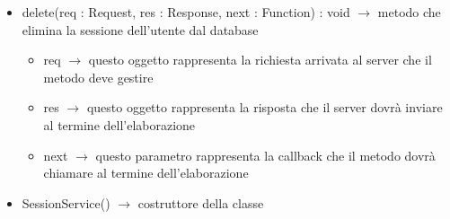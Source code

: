 \begin{description}
\begin{itemize}
	\item delete(req : Request, res : Response, next : Function) : void $\rightarrow$ metodo che elimina la sessione dell'utente dal database\begin{itemize}
		\item req $\rightarrow$ questo oggetto rappresenta la richiesta arrivata al server che il metodo deve gestire
		\item res $\rightarrow$ questo oggetto rappresenta la risposta che il server dovrà inviare al termine dell'elaborazione
		\item next $\rightarrow$ questo parametro rappresenta la callback che il metodo dovrà chiamare al termine dell'elaborazione
	\end{itemize}
	
	\item SessionService() $\rightarrow$ costruttore della classe
\end{itemize}

\end{description}

\vspace{0.5cm}
\hypertarget{server::service::RoleService}{}
